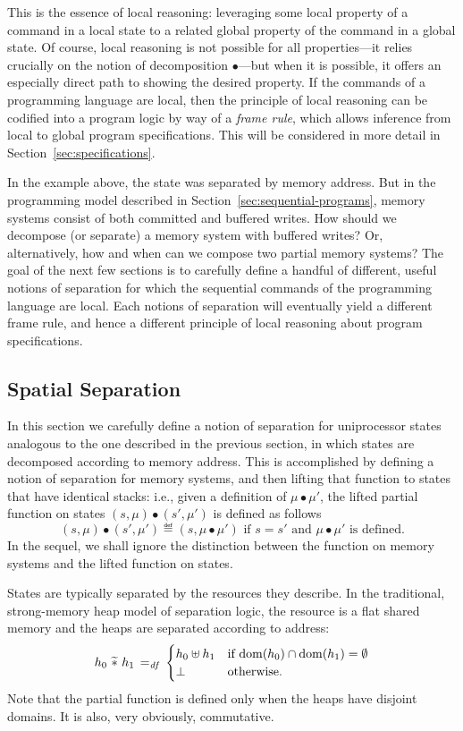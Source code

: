 \documentclass[11pt]{report}         %
\begin{document}
This is the essence of local reasoning: leveraging some local property of a command in a local state to a related global property of the command in a global state. Of course, local reasoning is not possible for all properties---it relies crucially on the notion of decomposition $\bullet$---but when it is possible, it offers an especially direct path to showing the desired property. If the commands of a programming language are local, then the principle of local reasoning can be codified into a program logic by way of a \emph{frame rule}, which allows inference from local to global program specifications. This will be considered in more detail in Section~\ref{sec:specifications}. 

In the example above, the state was separated by memory address. But in the programming model described in Section~\ref{sec:sequential-programs}, memory systems consist of both committed and buffered writes. How should we decompose (or separate) a memory system with buffered writes? Or, alternatively, how and when can we compose two partial memory systems? The goal of the next few sections is to carefully define a handful of different, useful notions of separation for which the sequential commands of the programming language are local. Each notions of separation will eventually yield a different frame rule, and hence a different principle of local reasoning about program specifications. 

\subsection{Spatial Separation}
\label{sec:sequential-spatial-separation}

In this section we carefully define a notion of separation for uniprocessor states analogous to the one described in the previous section, in which states are decomposed according to memory address. This is accomplished by defining a notion of separation for memory systems, and then lifting that function to states that have identical stacks: i.e., given a definition of $\mu \bullet \mu'$, the lifted partial function on states $(s,\mu) \bullet (s',\mu')$ is defined as follows \[ (s,\mu) \bullet (s',\mu') \eqdef (s,\mu \bullet \mu') \text{~if $s = s'$ and $\mu \bullet \mu'$ is defined.}\] In the sequel, we shall ignore the distinction between the function on memory systems and the lifted function on states. 

States are typically separated by the resources they describe. In the traditional, strong-memory heap model of separation logic, the resource is a flat shared memory and the heaps are separated according to address: \[ h_0 \operatorname{\,\widetilde{\ast}\,} h_1 \operatorname{\;=_{\mathit{df}}\;} \begin{cases}
    h_0 \uplus h_1 & \text{if $\operatorname{\mathrm{dom}}(h_0) \cap \operatorname{\mathrm{dom}}(h_1) = \operatorname{\emptyset}$} \\ 
    \bot & \text{otherwise.}
\end{cases}\] Note that the partial function is defined only when the heaps have disjoint domains. It is also, very obviously, commutative. 
\end{document}
